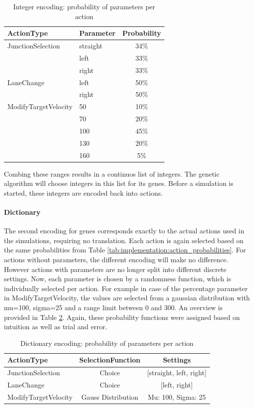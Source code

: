 \begin{table}[ht]
	\centering
	\begin{tabular}{llc}
		\hline
		ActionType & Parameter & Probability \\
		\hline
		JunctionSelection 	& straight & 34\% \\
		& left & 33\% \\
		& right & 33\% \\
		\hline
		LaneChange 			& left & 50\% \\
		& right & 50\% \\
		\hline
		ModifyTargetVelocity & 50 & 10\%\\
		& 70 & 20\%\\
		& 100 & 45\%\\
		& 130 & 20\%\\
		& 160 & 5\%\\
		\hline
	\end{tabular}
	\caption{Integer encoding: probability of parameters per action}
	\label{tab:implementation:integer_encoding_probabilities}
\end{table}

Combing these ranges results in a continuos list of integers. The genetic algorithm will choose integers in this list for its genes. Before a simulation is started, these integers are encoded back into actions.

\paragraph{Dictionary}
The second encoding for genes corresponds exactly to the actual actions used in the simulations, requiring no translation. Each action is again selected based on the same probabilities from Table \ref{tab:implementation:action_probabilities}. For actions without parameters, the different encoding will make no difference. However actions with parameters are no longer split into different discrete settings. Now, each parameter is chosen by a randomness function, which is individually selected per action. For example in case of the percentage parameter in ModifyTargetVelocity, the values are selected from a gaussian distribution with mu=100, sigma=25 and a range limit between 0 and 300. An overview is provided in Table \ref{tab:implementation:dict_encoding_probabilities}.
Again, these probability functions were assigned based on intuition as well as trial and error. 

\begin{table}[ht]
	\centering
	\begin{tabular}{lcc}
		\hline
		ActionType & SelectionFunction & Settings \\
		\hline
		JunctionSelection 	& Choice & [straight, left, right] \\
		LaneChange 			& Choice & [left, right]\\
		ModifyTargetVelocity & Gauss Distribution & Mu: 100, Sigma: 25\\
		\hline
	\end{tabular}
	\caption{Dictionary encoding: probability of parameters per action}
	\label{tab:implementation:dict_encoding_probabilities}
\end{table}

